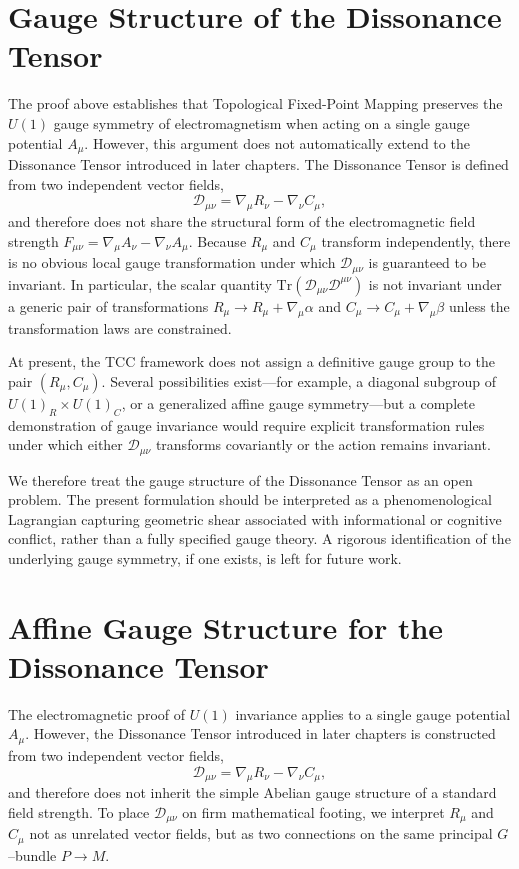 \documentclass[12pt,openany]{book}
\theoremstyle{plain}
\theoremstyle{definition}
\theoremstyle{remark}
\begin{document}
\section{Gauge Structure of the Dissonance Tensor}

The proof above establishes that Topological Fixed-Point Mapping preserves 
the $U(1)$ gauge symmetry of electromagnetism when acting on a single gauge 
potential $A_\mu$. However, this argument does not automatically extend to 
the Dissonance Tensor introduced in later chapters. The Dissonance Tensor is 
defined from two independent vector fields,
\[
\mathcal{D}_{\mu\nu} = \nabla_\mu R_\nu - \nabla_\nu C_\mu,
\]
and therefore does not share the structural form of the electromagnetic 
field strength $F_{\mu\nu} = \nabla_\mu A_\nu - \nabla_\nu A_\mu$. Because 
$R_\mu$ and $C_\mu$ transform independently, there is no obvious local gauge 
transformation under which $\mathcal{D}_{\mu\nu}$ is guaranteed to be 
invariant. In particular, the scalar quantity 
$\mathrm{Tr}(\mathcal{D}_{\mu\nu}\mathcal{D}^{\mu\nu})$ is not invariant 
under a generic pair of transformations 
$R_\mu \rightarrow R_\mu + \nabla_\mu \alpha$ and 
$C_\mu \rightarrow C_\mu + \nabla_\mu \beta$ unless the transformation laws 
are constrained.

At present, the TCC framework does not assign a definitive gauge group to 
the pair $(R_\mu, C_\mu)$. Several possibilities exist—for example, a 
diagonal subgroup of $U(1)_R \times U(1)_C$, or a generalized affine gauge 
symmetry—but a complete demonstration of gauge invariance would require 
explicit transformation rules under which either $\mathcal{D}_{\mu\nu}$ 
transforms covariantly or the action remains invariant.

We therefore treat the gauge structure of the Dissonance Tensor as an open 
problem. The present formulation should be interpreted as a phenomenological 
Lagrangian capturing geometric shear associated with informational or 
cognitive conflict, rather than a fully specified gauge theory. A rigorous 
identification of the underlying gauge symmetry, if one exists, is left for 
future work.

\section{Affine Gauge Structure for the Dissonance Tensor}

The electromagnetic proof of $U(1)$ invariance applies to a single gauge potential $A_\mu$. However, the Dissonance Tensor introduced in later chapters is constructed from two independent vector fields,
\[
\mathcal{D}_{\mu\nu} = \nabla_\mu R_\nu - \nabla_\nu C_\mu,
\]
and therefore does not inherit the simple Abelian gauge structure of a standard field strength. To place $\mathcal{D}_{\mu\nu}$ on firm mathematical footing, we interpret $R_\mu$ and $C_\mu$ not as unrelated vector fields, but as two connections on the same principal $G$--bundle $P \to M$. 
\end{document}
